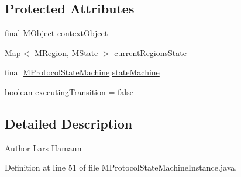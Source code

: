 \subsection*{Protected Attributes}
\begin{DoxyCompactItemize}
\item 
final \hyperlink{interfaceorg_1_1tzi_1_1use_1_1uml_1_1sys_1_1_m_object}{M\-Object} \hyperlink{classorg_1_1tzi_1_1use_1_1uml_1_1sys_1_1statemachines_1_1_m_protocol_state_machine_instance_ab07abddb1a194dbfbee7e0630e226c65}{context\-Object}
\item 
Map$<$ \hyperlink{classorg_1_1tzi_1_1use_1_1uml_1_1mm_1_1statemachines_1_1_m_region}{M\-Region}, \hyperlink{classorg_1_1tzi_1_1use_1_1uml_1_1mm_1_1statemachines_1_1_m_state}{M\-State} $>$ \hyperlink{classorg_1_1tzi_1_1use_1_1uml_1_1sys_1_1statemachines_1_1_m_protocol_state_machine_instance_a4608c0db4e5b1a6cbcdbb1eec5708b57}{current\-Regions\-State}
\item 
final \hyperlink{classorg_1_1tzi_1_1use_1_1uml_1_1mm_1_1statemachines_1_1_m_protocol_state_machine}{M\-Protocol\-State\-Machine} \hyperlink{classorg_1_1tzi_1_1use_1_1uml_1_1sys_1_1statemachines_1_1_m_protocol_state_machine_instance_a09539f4401e525af4779585bc31addfa}{state\-Machine}
\item 
boolean \hyperlink{classorg_1_1tzi_1_1use_1_1uml_1_1sys_1_1statemachines_1_1_m_protocol_state_machine_instance_aca38770f89c09828112d7996118fc85c}{executing\-Transition} = false
\end{DoxyCompactItemize}


\subsection{Detailed Description}
\begin{DoxyAuthor}{Author}
Lars Hamann 
\end{DoxyAuthor}


Definition at line 51 of file M\-Protocol\-State\-Machine\-Instance.\-java.



